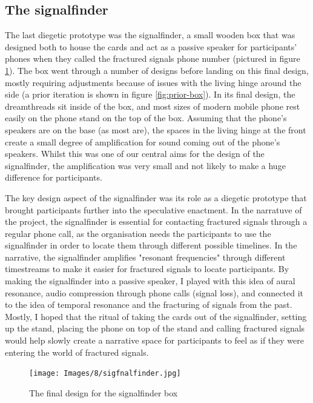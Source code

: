 \subsection{The signalfinder}

The last diegetic prototype was the signalfinder, a small wooden box that was designed both to house the cards and act as a passive speaker for participants’ phones when they called the fractured signals phone number (pictured in figure \ref{fig:signalfinder}). The box went through a number of designs before landing on this final design, mostly requiring adjustments because of issues with the living hinge around the side (a prior iteration is shown in figure \ref{fig:prior-box}). In its final design, the dreamthreads sit inside of the box, and most sizes of modern mobile phone rest easily on the phone stand on the top of the box. Assuming that the phone’s speakers are on the base (as most are), the spaces in the living hinge at the front create a small degree of amplification for sound coming out of the phone’s speakers. Whilst this was one of our central aims for the design of the signalfinder, the amplification was very small and not likely to make a huge difference for participants. 

The key design aspect of the signalfinder was its role as a diegetic prototype that brought participants further into the speculative enactment. In the narratuve of the project, the signalfinder is essential for contacting fractured signals through a regular phone call, as the organisation needs the participants to use the signalfinder in order to locate them through different possible timelines. In the narrative, the signalfinder amplifies "resonant frequencies" through different timestreams to make it easier for fractured signals to locate participants. By making the signalfinder into a passive speaker, I played with this idea of aural resonance, audio compression through phone calls (signal loss), and connected it to the idea of temporal resonance and the fracturing of signals from the past. Mostly, I hoped that the ritual of taking the cards out of the signalfinder, setting up the stand, placing the phone on top of the stand and calling fractured signals would help slowly create a narrative space for participants to feel as if they were entering the world of fractured signals. 

\begin{figure}
    \centering
    \texttt{[image: Images/8/sigfnalfinder.jpg]}
    \caption{The final design for the signalfinder box}
    \label{fig:signalfinder}
\end{figure}

